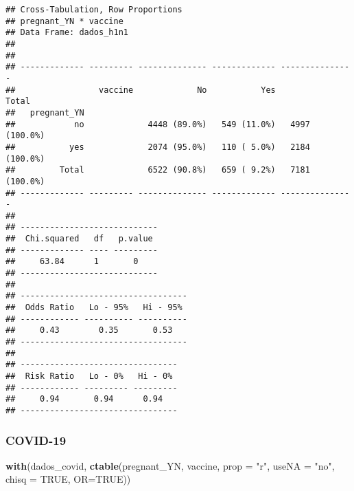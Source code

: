 \documentclass[
]{article}
\newenvironment{Shaded}{\begin{snugshade}}{\end{snugshade}}
\newcommand{\CommentTok}[1]{\textcolor[rgb]{0.56,0.35,0.01}{\textit{#1}}}
\newcommand{\DataTypeTok}[1]{\textcolor[rgb]{0.13,0.29,0.53}{#1}}
\newcommand{\DecValTok}[1]{\textcolor[rgb]{0.00,0.00,0.81}{#1}}
\newcommand{\KeywordTok}[1]{\textcolor[rgb]{0.13,0.29,0.53}{\textbf{#1}}}
\newcommand{\NormalTok}[1]{#1}
\newcommand{\OperatorTok}[1]{\textcolor[rgb]{0.81,0.36,0.00}{\textbf{#1}}}
\newcommand{\OtherTok}[1]{\textcolor[rgb]{0.56,0.35,0.01}{#1}}
\newcommand{\StringTok}[1]{\textcolor[rgb]{0.31,0.60,0.02}{#1}}
\begin{document}
\begin{verbatim}
## Cross-Tabulation, Row Proportions  
## pregnant_YN * vaccine  
## Data Frame: dados_h1n1  
## 
## 
## ------------- --------- -------------- ------------- ---------------
##                 vaccine             No           Yes           Total
##   pregnant_YN                                                       
##            no             4448 (89.0%)   549 (11.0%)   4997 (100.0%)
##           yes             2074 (95.0%)   110 ( 5.0%)   2184 (100.0%)
##         Total             6522 (90.8%)   659 ( 9.2%)   7181 (100.0%)
## ------------- --------- -------------- ------------- ---------------
## 
## ----------------------------
##  Chi.squared   df   p.value 
## ------------- ---- ---------
##     63.84      1       0    
## ----------------------------
## 
## ----------------------------------
##  Odds Ratio   Lo - 95%   Hi - 95% 
## ------------ ---------- ----------
##     0.43        0.35       0.53   
## ----------------------------------
## 
## --------------------------------
##  Risk Ratio   Lo - 0%   Hi - 0% 
## ------------ --------- ---------
##     0.94       0.94      0.94   
## --------------------------------
\end{verbatim}

\hypertarget{covid-19-4}{%
\subsubsection{COVID-19}\label{covid-19-4}}

\begin{Shaded}
\end{Shaded}

\begin{Shaded}
\begin{Highlighting}[]
\KeywordTok{with}\NormalTok{(dados_covid, }\KeywordTok{ctable}\NormalTok{(pregnant_YN, vaccine, }\DataTypeTok{prop =} \StringTok{"r"}\NormalTok{, }\DataTypeTok{useNA =} \StringTok{"no"}\NormalTok{, }\DataTypeTok{chisq =} \OtherTok{TRUE}\NormalTok{, }\DataTypeTok{OR=}\OtherTok{TRUE}\NormalTok{))}
\end{Highlighting}
\end{Shaded}
\end{document}
